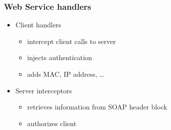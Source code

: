 \documentclass[10pt,xcolor=pdflatex]{beamer}
\begin{document}
\begin{frame}[containsverbatim]\frametitle{Web Service handlers}
\begin{itemize}
	\item Client handlers
	  \begin{itemize}
		\item intercept client calls to server
		\item injects authentication
		\item adds MAC, IP address, \ldots
	  \end{itemize}
    \item Server interceptors
	  \begin{itemize}
		\item retrieves information from SOAP header block
		\item authorizes client
	  \end{itemize}
\end{itemize}
\end{frame}
\end{document}
